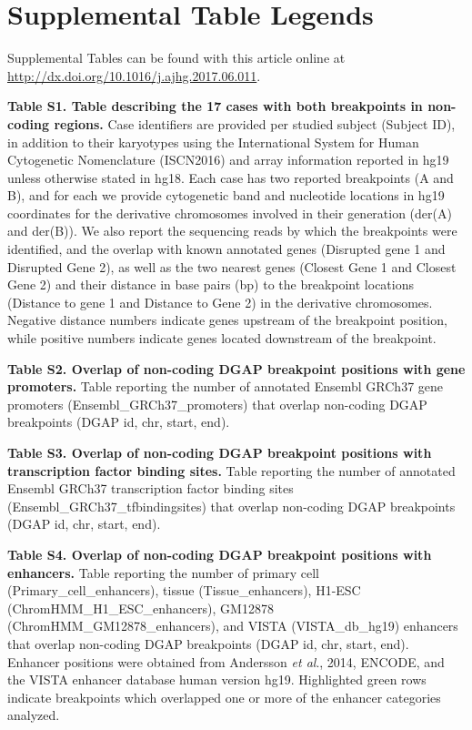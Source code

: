 \documentclass[a4paper,twoside=true,openright,parskip=full,chapterprefix=true,11pt,headings=normal,bibliography=totoc,listof=totoc,titlepage=on,captions=tableabove,draft=false]{scrreprt}
\theoremstyle{definition}
\theoremstyle{definition}
\theoremstyle{definition}
\theoremstyle{remark}
\begin{document}
\hypertarget{position-effect-sub-tab}{%
\section{Supplemental Table Legends}\label{position-effect-sub-tab}}

Supplemental Tables can be found with this article online at
\url{http://dx.doi.org/10.1016/j.ajhg.2017.06.011}.

\textbf{Table S1. Table describing the 17 cases with both breakpoints in
non-coding regions.} Case identifiers are provided per studied subject
(Subject ID), in addition to their karyotypes using the International
System for Human Cytogenetic Nomenclature (ISCN2016) and array
information reported in hg19 unless otherwise stated in hg18. Each case
has two reported breakpoints (A and B), and for each we provide
cytogenetic band and nucleotide locations in hg19 coordinates for the
derivative chromosomes involved in their generation (der(A) and der(B)).
We also report the sequencing reads by which the breakpoints were
identified, and the overlap with known annotated genes (Disrupted gene 1
and Disrupted Gene 2), as well as the two nearest genes (Closest Gene 1
and Closest Gene 2) and their distance in base pairs (bp) to the
breakpoint locations (Distance to gene 1 and Distance to Gene 2) in the
derivative chromosomes. Negative distance numbers indicate genes
upstream of the breakpoint position, while positive numbers indicate
genes located downstream of the breakpoint.

\textbf{Table S2. Overlap of non-coding DGAP breakpoint positions with
gene promoters.} Table reporting the number of annotated Ensembl GRCh37
gene promoters (Ensembl\_GRCh37\_promoters) that overlap non-coding DGAP
breakpoints (DGAP id, chr, start, end).

\textbf{Table S3. Overlap of non-coding DGAP breakpoint positions with
transcription factor binding sites.} Table reporting the number of
annotated Ensembl GRCh37 transcription factor binding sites
(Ensembl\_GRCh37\_tfbindingsites) that overlap non-coding DGAP
breakpoints (DGAP id, chr, start, end).

\textbf{Table S4. Overlap of non-coding DGAP breakpoint positions with
enhancers.} Table reporting the number of primary cell
(Primary\_cell\_enhancers), tissue (Tissue\_enhancers), H1-ESC
(ChromHMM\_H1\_ESC\_enhancers), GM12878 (ChromHMM\_GM12878\_enhancers),
and VISTA (VISTA\_db\_hg19) enhancers that overlap non-coding DGAP
breakpoints (DGAP id, chr, start, end). Enhancer positions were obtained
from Andersson \emph{et al}., 2014, ENCODE, and the VISTA enhancer
database human version hg19. Highlighted green rows indicate breakpoints
which overlapped one or more of the enhancer categories analyzed.
\end{document}
